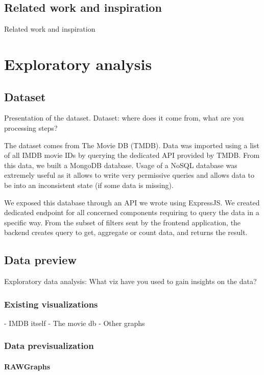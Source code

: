 \documentclass[a4paper,10pt]{article}
\begin{document}
\subsection{Related work and inspiration}

Related work and inspiration

\section{Exploratory analysis}

\subsection{Dataset}

Presentation of the dataset.
Dataset: where does it come from, what are you processing steps?

The dataset comes from The Movie DB (TMDB). Data was imported
using a list of all IMDB movie IDs by querying the dedicated API provided by TMDB.
From this data, we built a MongoDB database. Usage of a NoSQL database was extremely
useful as it allows to write very permissive queries and allows data to be into
an inconsistent state (if some data is missing).

We exposed this database through an API we wrote using ExpressJS. We created dedicated
endpoint for all concerned components requiring to query the data in a specific way.
From the subset of filters sent by the frontend application, the backend creates
query to get, aggregate or count data, and returns the result.

\subsection{Data preview}

Exploratory data analysis: What viz have you used to gain insights on the data?

\subsubsection{Existing visualizations}

- IMDB itself
- The movie db
- Other graphs

\subsubsection{Data previsualization}

\paragraph{RAWGraphs}
\end{document}
